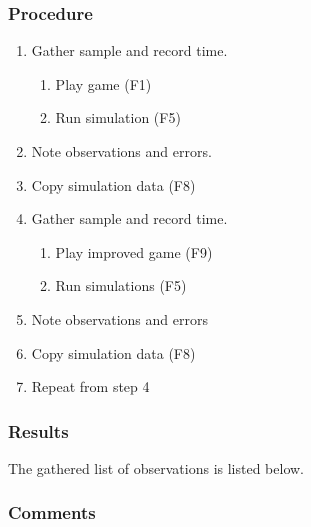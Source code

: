 \subsubsection{Procedure}
\begin{enumerate}
	\item Gather sample and record time.
	\begin{enumerate}
		\item Play game (F1)
		\item Run simulation (F5)
	\end{enumerate}
	\item Note observations and errors.
	\item Copy simulation data (F8)
	\item Gather sample and record time.
	\begin{enumerate}
		\item Play improved game (F9)
		\item Run simulations (F5)
	\end{enumerate}
	\item Note observations and errors
	\item Copy simulation data (F8)
	\item Repeat from step 4
\end{enumerate}

\subsubsection{Results}
The gathered list of observations is listed below.

\subsubsection*{Comments}

